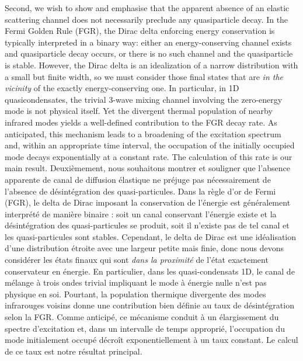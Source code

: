 \documentclass[aps,prd,notitlepage,amsfonts,amssymb,amsmath,nofootinbib,superscriptaddress,longbibliography]{revtex4-2}
\newcommand{\trad}[1]{\textcolor{tradcolor}{#1}}
\begin{document}
Second, we wish to show and emphasise that the apparent absence of an elastic scattering channel 
does not necessarily preclude any quasiparticle decay. 
In the Fermi Golden Rule (FGR), the Dirac delta enforcing energy conservation is typically interpreted in a binary way: either an energy-conserving channel exists and quasiparticle decay occurs, or there is no such channel and the quasiparticle is stable.
However, the Dirac delta is an idealization of a narrow distribution with a small but finite width, so we must consider those final states that are {\it in the vicinity} of the exactly energy-conserving one.
In particular, in 1D quasicondensates, the trivial 3-wave mixing channel involving the zero-energy mode is not physical itself. Yet the divergent thermal population of nearby infrared modes yields a well-defined contribution to the FGR decay rate.  
As anticipated, this mechanism leads to a broadening of the excitation spectrum and, within an appropriate time interval, the occupation of the initially occupied mode decays exponentially at a constant rate.
The calculation of this rate is our main result.
\trad{
Deuxièmement, nous souhaitons montrer et souligner que l'absence apparente de canal de diffusion élastique ne préjuge pas nécessairement de l'absence de désintégration des quasi-particules. 
Dans la règle d'or de Fermi (FGR), le delta de Dirac imposant la conservation de l'énergie est généralement interprété de manière binaire : soit un canal conservant l'énergie existe et la désintégration des quasi-particules se produit, soit il n'existe pas de tel canal et les quasi-particules sont stables. Cependant, le delta de Dirac est une idéalisation d'une distribution étroite avec une largeur petite mais finie, donc nous devons considérer les états finaux qui sont {\it dans la proximité} de l'état exactement conservateur en énergie.
En particulier, dans les quasi-condensats 1D, le canal de mélange à trois ondes trivial impliquant le mode à énergie nulle n'est pas physique en soi. Pourtant, la population thermique divergente des modes infrarouges voisins donne une contribution bien définie au taux de désintégration selon la FGR. Comme anticipé, ce mécanisme conduit à un élargissement du spectre d'excitation et, dans un intervalle de temps approprié, l'occupation du mode initialement occupé décroît exponentiellement à un taux constant. Le calcul de ce taux est notre résultat principal.
}
\end{document}
